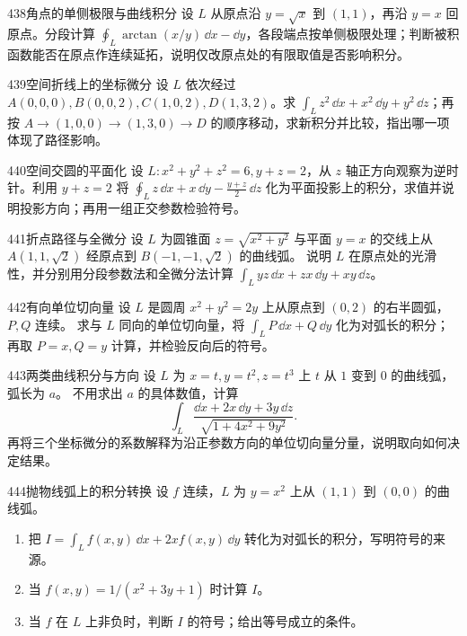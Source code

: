 \begin{exercise}{438}{角点的单侧极限与曲线积分}
设 $L$ 从原点沿 $y=\sqrt x$ 到 $(1,1)$，再沿 $y=x$ 回原点。分段计算 $\oint_L\arctan(x/y)\,\dd x-\dd y$，各段端点按单侧极限处理；判断被积函数能否在原点作连续延拓，说明仅改原点处的有限取值是否影响积分。
\end{exercise}

\begin{exercise}{439}{空间折线上的坐标微分}
设 $L$ 依次经过 $A(0,0,0),B(0,0,2),C(1,0,2),D(1,3,2)$。求 $\int_Lz^2\,\dd x+x^2\,\dd y+y^2\,\dd z$；再按 $A\to(1,0,0)\to(1,3,0)\to D$ 的顺序移动，求新积分并比较，指出哪一项体现了路径影响。
\end{exercise}

\begin{exercise}{440}{空间交圆的平面化}
设 $L:x^2+y^2+z^2=6,y+z=2$，从 $z$ 轴正方向观察为逆时针。利用 $y+z=2$ 将
$\oint_Lz\,\dd x+x\,\dd y-\frac{y+z}{2}\,\dd z$ 化为平面投影上的积分，求值并说明投影方向；再用一组正交参数检验符号。
\end{exercise}

\begin{exercise}{441}{折点路径与全微分}
设 $L$ 为圆锥面 $z=\sqrt{x^2+y^2}$ 与平面 $y=x$ 的交线上从 $A(1,1,\sqrt2)$ 经原点到 $B(-1,-1,\sqrt2)$ 的曲线弧。
说明 $L$ 在原点处的光滑性，并分别用分段参数法和全微分法计算
$\int_Lyz\,\dd x+zx\,\dd y+xy\,\dd z$。
\end{exercise}

\begin{exercise}{442}{有向单位切向量}
设 $L$ 是圆周 $x^2+y^2=2y$ 上从原点到 $(0,2)$ 的右半圆弧，$P,Q$ 连续。
求与 $L$ 同向的单位切向量，将 $\int_LP\,\dd x+Q\,\dd y$ 化为对弧长的积分；再取 $P=x,Q=y$ 计算，并检验反向后的符号。
\end{exercise}

\begin{exercise}{443}{两类曲线积分与方向}
设 $L$ 为 $x=t,y=t^2,z=t^3$ 上 $t$ 从 $1$ 变到 $0$ 的曲线弧，弧长为 $a$。
不用求出 $a$ 的具体数值，计算
\[
 \int_L\frac{\dd x+2x\,\dd y+3y\,\dd z}{\sqrt{1+4x^2+9y^2}}.
\]
再将三个坐标微分的系数解释为沿正参数方向的单位切向量分量，说明取向如何决定结果。
\end{exercise}

\begin{exercise}{444}{抛物线弧上的积分转换}
设 $f$ 连续，$L$ 为 $y=x^2$ 上从 $(1,1)$ 到 $(0,0)$ 的曲线弧。
\begin{enumerate}[label=(\arabic*)]
\item 把 $I=\int_L f(x,y)\,\dd x+2xf(x,y)\,\dd y$ 转化为对弧长的积分，写明符号的来源。
\item 当 $f(x,y)=1/(x^2+3y+1)$ 时计算 $I$。
\item 当 $f$ 在 $L$ 上非负时，判断 $I$ 的符号；给出等号成立的条件。
\end{enumerate}
\end{exercise}

